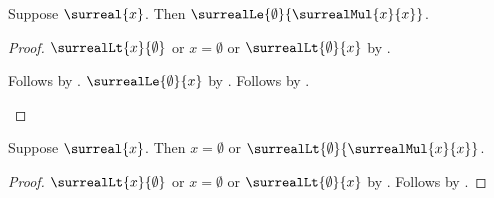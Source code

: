 \begin{theorem}\label{surreal_square_nonnegative}
    Suppose $\surreal{x}$.
    Then $\surrealLe{\emptyset}{\surrealMul{x}{x}}$.
\end{theorem}
\begin{proof}
    $\surrealLt{x}{\emptyset}$ or $x=\emptyset$ or
        $\surrealLt{\emptyset}{x}$
        by .
    \begin{byCase}
            Follows by .
            $\surrealLe{\emptyset}{x}$ by .
            Follows by .
    \end{byCase}
\end{proof}

\begin{theorem}\label{surreal_zero_or_square_positive}
    Suppose $\surreal{x}$.
    Then $x=\emptyset$ or
        $\surrealLt{\emptyset}{\surrealMul{x}{x}}$.
\end{theorem}
\begin{proof}
    $\surrealLt{x}{\emptyset}$ or $x=\emptyset$ or
        $\surrealLt{\emptyset}{x}$
        by .
    Follows by
        .
\end{proof}

